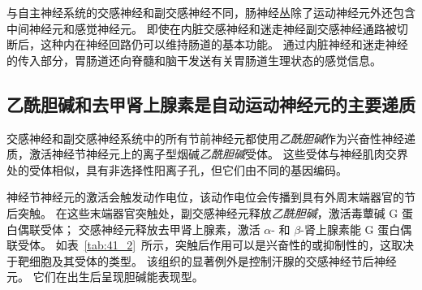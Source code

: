 与自主神经系统的交感神经和副交感神经不同，肠神经丛除了运动神经元外还包含中间神经元和感觉神经元。
即使在内脏交感神经和迷走神经副交感神经通路被切断后，这种内在神经回路仍可以维持肠道的基本功能。
通过内脏神经和迷走神经的传入部分，胃肠道还向脊髓和脑干发送有关胃肠道生理状态的感觉信息。



\subsection{乙酰胆碱和去甲肾上腺素是自动运动神经元的主要递质}

交感神经和副交感神经系统中的所有节前神经元都使用\textit{乙酰胆碱}作为兴奋性神经递质，激活神经节神经元上的离子型烟碱\textit{乙酰胆碱}受体。
这些受体与神经肌肉交界处的受体相似，具有非选择性阳离子孔，但它们由不同的基因编码。


神经节神经元的激活会触发动作电位，该动作电位会传播到具有外周末端器官的节后突触。
在这些末端器官突触处，副交感神经元释放\textit{乙酰胆碱}，激活毒蕈碱 G 蛋白偶联受体；
交感神经元释放去甲肾上腺素，激活 $\alpha$- 和 $\beta$-肾上腺素能 G 蛋白偶联受体。
如表~\ref{tab:41_2}~所示，突触后作用可以是兴奋性的或抑制性的，这取决于靶细胞及其受体的类型。
该组织的显著例外是控制汗腺的交感神经节后神经元。
它们在出生后呈现胆碱能表现型。


